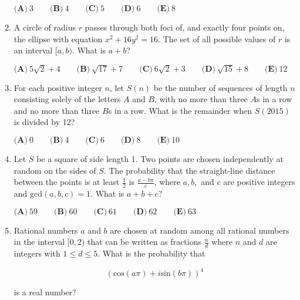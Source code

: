 \documentclass{article}
\begin{document}
\begin{enumerate}[label=\arabic*., itemsep=0.5em]
$ \textbf{(A)}\ 3 \qquad\textbf{(B)}\ 4 \qquad\textbf{(C)}\ 5 \qquad\textbf{(D)}\ 6 \qquad\textbf{(E)}\ 8$\par \vspace{0.5em}\item A circle of radius $r$ passes through both foci of, and exactly four points on, the ellipse with equation $x^2+16y^2=16$. The set of all possible values of $r$ is an interval $[a,b)$. What is $a+b$?

$ \textbf{(A)}\ 5\sqrt{2}+4 \qquad\textbf{(B)}\ \sqrt{17}+7 \qquad\textbf{(C)}\ 6\sqrt{2}+3 \qquad\textbf{(D)}\ \sqrt{15}+8 \qquad\textbf{(E)}\ 12$\par \vspace{0.5em}\item For each positive integer $n$, let $S(n)$ be the number of sequences of length $n$ consisting solely of the letters $A$ and $B$, with no more than three $A$s in a row and no more than three $B$s in a row. What is the remainder when $S(2015)$ is divided by 12?

$ \textbf{(A)}\ 0 \qquad\textbf{(B)}\ 4 \qquad\textbf{(C)}\ 6 \qquad\textbf{(D)}\ 8 \qquad\textbf{(E)}\ 10$\par \vspace{0.5em}\item Let $S$ be a square of side length 1. Two points are chosen independently at random on the sides of $S$. The probability that the straight-line distance between the points is at least $\frac12$ is $\frac{a-b\pi}{c}$, where $a,b,$ and $c$ are positive integers and $\text{gcd}(a,b,c) = 1$. What is $a+b+c$?

$ \textbf{(A)}\ 59 \qquad\textbf{(B)}\ 60 \qquad\textbf{(C)}\ 61 \qquad\textbf{(D)}\ 62 \qquad\textbf{(E)}\ 63$\par \vspace{0.5em}\item Rational numbers $a$ and $b$ are chosen at random among all rational numbers in the interval $[0,2)$ that can be written as fractions $\frac{n}{d}$ where $n$ and $d$ are integers with $1 \le d \le 5$. What is the probability that

\begin{equation*}
(\text{cos}(a\pi)+i\text{sin}(b\pi))^4
\end{equation*}

is a real number?


\end{enumerate}
\end{document}
